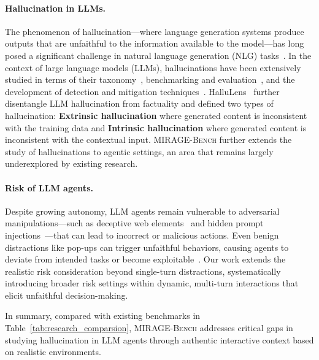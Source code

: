 \paragraph{Hallucination in LLMs.}
The phenomenon of hallucination---where language generation systems produce outputs that are unfaithful to the information available to the model---has long posed a significant challenge in natural language generation (NLG) tasks~\cite{ji2023survey}. In the context of large language models (LLMs), hallucinations have been extensively studied in terms of their taxonomy~\cite{rawte2023troubling,huang2025survey}, benchmarking and evaluation~\cite{li2024dawn,niu2023ragtruth,luo2024halludial}, and the development of detection and mitigation techniques~\cite{farquhar2024detecting,varshney2023stitch, tonmoy2024comprehensive}. HalluLens~\cite{bang2025hallulens} further disentangle LLM hallucination from factuality and defined two types of hallucination: \textbf{Extrinsic hallucination} where generated content is inconsistent with the training data and \textbf{Intrinsic hallucination} where generated content is inconsistent with the contextual input. \textsc{MIRAGE-Bench} further extends the study of hallucinations to agentic settings, an area that remains largely underexplored by existing research. 

\paragraph{Risk of LLM agents.}
Despite growing autonomy, LLM agents remain vulnerable to adversarial manipulations---such as deceptive web elements~\cite{wu2024adversarial,zhang2024attacking} and hidden prompt injections~\cite{xu2024advweb}---that can lead to incorrect or malicious actions. Even benign distractions like pop-ups can trigger unfaithful behaviors, causing agents to deviate from intended tasks or become exploitable~\cite{ma2024caution}. Our work extends the realistic risk consideration beyond single-turn distractions, systematically introducing broader risk settings within dynamic, multi-turn interactions that elicit unfaithful decision-making.

In summary, compared with existing benchmarks in Table~\ref{tab:research_comparsion}, \textsc{MIRAGE-Bench} addresses critical gaps in studying hallucination in LLM agents through authentic interactive context based on realistic environments.